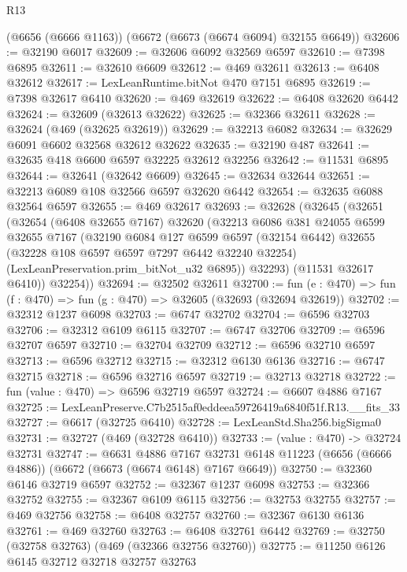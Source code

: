 \begin{lexlean}{R13}
\begin{coremodule}
    (@6656 (@6666 @1163))
    (@6672 (@6673 (@6674 @6094) @32155 @6649))
@32606 := @32190 @6017
@32609 := @32606 @6092 @32569 @6597
@32610 := @7398 @6895
@32611 := @32610 @6609
@32612 := @469 @32611
@32613 := @6408 @32612
@32617 := LexLeanRuntime.bitNot @470 @7151 @6895
@32619 := @7398 @32617 @6410
@32620 := @469 @32619
@32622 := @6408 @32620 @6442
@32624 := @32609 (@32613 @32622)
@32625 := @32366 @32611
@32628 := @32624 (@469 (@32625 @32619))
@32629 := @32213 @6082
@32634 := @32629 @6091 @6602 @32568 @32612 @32622
@32635 := @32190 @487
@32641 := @32635 @418 @6600 @6597 @32225 @32612 @32256
@32642 := @11531 @6895
@32644 := @32641 (@32642 @6609)
@32645 := @32634 @32644
@32651 := @32213 @6089 @108 @32566 @6597 @32620 @6442
@32654 := @32635 @6088 @32564 @6597
@32655 := @469 @32617
@32693 := @32628
    (@32645
      (@32651
        (@32654
          (@6408 @32655 @7167)
          @32620
          (@32213
            @6086
            @381
            @24055
            @6599
            @32655
            @7167
            (@32190
              @6084
              @127
              @6599
              @6597
              (@32154 @6442)
              @32655
              (@32228 @108 @6597 @6597 @7297 @6442 @32240 @32254)
              (LexLeanPreservation.prim_bitNot_u32 @6895))
            @32293)
          (@11531 @32617 @6410))
        @32254))
@32694 := @32502 @32611
@32700 := fun (e : @470) => fun (f : @470) => fun (g : @470) => @32605 (@32693 (@32694 @32619))
@32702 := @32312 @1237 @6098
@32703 := @6747 @32702
@32704 := @6596 @32703
@32706 := @32312 @6109 @6115
@32707 := @6747 @32706
@32709 := @6596 @32707 @6597
@32710 := @32704 @32709
@32712 := @6596 @32710 @6597
@32713 := @6596 @32712
@32715 := @32312 @6130 @6136
@32716 := @6747 @32715
@32718 := @6596 @32716 @6597
@32719 := @32713 @32718
@32722 := fun (value : @470) => @6596 @32719 @6597
@32724 := @6607 @4886 @7167
@32725 := LexLeanPreserve.C7b2515af0eddeea59726419a6840f51f.R13.__fits_33
@32727 := @6617 (@32725 @6410)
@32728 := LexLeanStd.Sha256.bigSigma0
@32731 := @32727 (@469 (@32728 @6410))
@32733 := (value : @470) -> @32724 @32731
@32747 := @6631
    @4886
    @7167
    @32731
    @6148
    @11223
    (@6656 (@6666 @4886))
    (@6672 (@6673 (@6674 @6148) @7167 @6649))
@32750 := @32360 @6146 @32719 @6597
@32752 := @32367 @1237 @6098
@32753 := @32366 @32752
@32755 := @32367 @6109 @6115
@32756 := @32753 @32755
@32757 := @469 @32756
@32758 := @6408 @32757
@32760 := @32367 @6130 @6136
@32761 := @469 @32760
@32763 := @6408 @32761 @6442
@32769 := @32750 (@32758 @32763) (@469 (@32366 @32756 @32760))
@32775 := @11250 @6126 @6145 @32712 @32718 @32757 @32763

\end{coremodule}
\end{lexlean}
